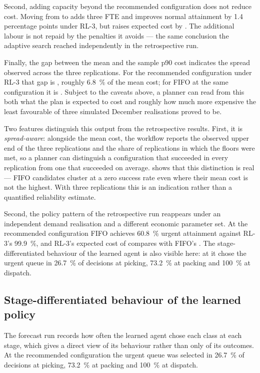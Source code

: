 Second, adding capacity beyond the recommended configuration does not reduce cost. Moving from
 to  adds three FTE and improves normal attainment by
1.4 percentage points under RL-3, but raises expected cost by . The additional
labour is not repaid by the penalties it avoids --- the same conclusion the adaptive search
reached independently in the retrospective run.

Finally, the gap between the mean and the sample p90 cost indicates the spread observed across
the three replications. For the recommended configuration under RL-3 that gap is ,
roughly \SI{6.8}{\percent} of the mean cost; for FIFO at the same configuration it is
. Subject to the caveats above, a planner can read from this both what the plan is
expected to cost and roughly how much more expensive the least favourable of three simulated
December realisations proved to be.

Two features distinguish this output from the retrospective results. First, it is
\emph{spread-aware}: alongside the mean cost, the workflow reports the observed upper end of the
three replications and the share of replications in which the floors were met, so a planner can
distinguish a configuration that succeeded in every replication from one that succeeded on
average.  shows that this distinction is real --- FIFO candidates cluster at a
zero success rate even where their mean cost is not the highest. With three replications this is
an indication rather than a quantified reliability estimate.

Second, the policy pattern of the retrospective run reappears under an independent demand
realisation and a different economic parameter set. At the recommended configuration FIFO
achieves \SI{60.8}{\percent} urgent attainment against RL-3's \SI{99.9}{\percent}, and RL-3's
expected cost of  compares with FIFO's . The stage-differentiated
behaviour of the learned agent is also visible here: at  it chose the urgent
queue in \SI{26.7}{\percent} of decisions at picking, \SI{73.2}{\percent} at packing and
\SI{100}{\percent} at dispatch.

\subsection{Stage-differentiated behaviour of the learned policy}
\label{sec:res-rl-behaviour}

The forecast run records how often the learned agent chose each class at each stage, which gives
a direct view of its behaviour rather than only of its outcomes. At the recommended
configuration the urgent queue was selected in \SI{26.7}{\percent} of decisions at picking,
\SI{73.2}{\percent} at packing and \SI{100}{\percent} at dispatch.

